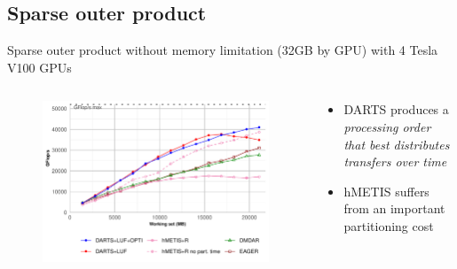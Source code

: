 \documentclass{libs/ufc_format}
\begin{document}
\subsection{Sparse outer product}
\begin{frame}{Sparse outer product without memory limitation (32GB by GPU) with 4 Tesla V100 GPUs}
    \begin{columns}{}
		\begin{column}{0.7\textwidth}
		\begin{figure}
			\center\includegraphics[scale = 0.45]{Images/GF_dynamic_data_aware_no_hfp_sparse_matrix_infinie_gemini-1-fgcs_4GPU.pdf}
		\end{figure}
		\end{column}
		\begin{column}{0.3\textwidth}
		\begin{itemize}
			\item DARTS produces a \emph{processing order that best distributes transfers over time} 
			\item hMETIS suffers from an important partitioning cost
		\end{itemize}
		\end{column}
	\end{columns}
\end{frame}

\end{document}
